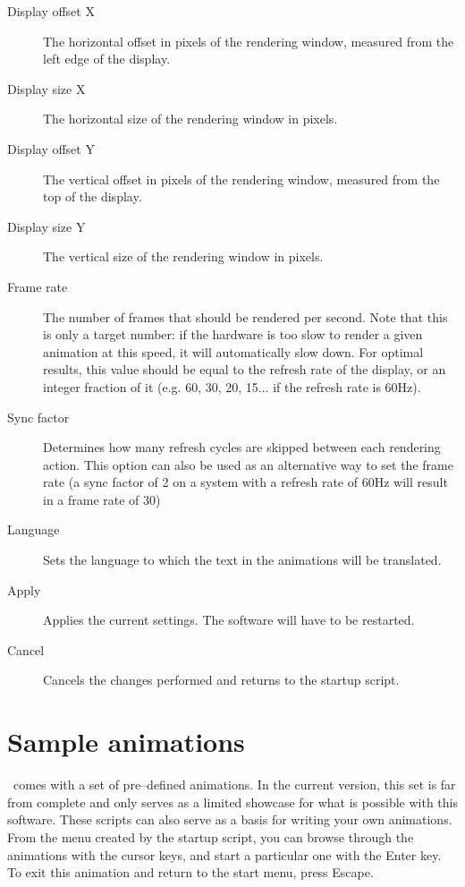 \begin{description}
\item[Display offset X] The horizontal offset in pixels of the rendering window, measured from the left edge of the display.
\item[Display size X] The horizontal size of the rendering window in pixels.
\item[Display offset Y] The vertical offset in pixels of the rendering window, measured from the top of the display.
\item[Display size Y] The vertical size of the rendering window in pixels.
\item[Frame rate] The number of frames that should be rendered per second. Note that this is only a target number: if the hardware is too slow to render a given animation at this speed, it will automatically slow down. For optimal results, this value should be equal to the refresh rate of the display, or an integer fraction of it (e.g. 60, 30, 20, 15... if the refresh rate is 60Hz).
\item[Sync factor] Determines how many refresh cycles are skipped between each rendering action. This option can also be used as an alternative way to set the frame rate (a sync factor of 2 on a system with a refresh rate of 60Hz will result in a frame rate of 30)
\item[Language] Sets the language to which the text in the animations will be translated.
\item[Apply] Applies the current settings. The software will have to be restarted.
\item[Cancel] Cancels the changes performed and returns to the startup script.
\end{description}


\section{Sample animations}
\softwarename\ comes with a set of pre--defined animations. In the current version, this set is far from complete and only serves as a limited showcase for what is possible with this software. These scripts can also serve as a basis for writing your own animations. From the menu created by the startup script, you can browse through the animations with the cursor keys, and start a particular one with the Enter key. To exit this animation and return to the start menu, press Escape.


